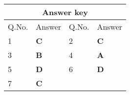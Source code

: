 \begin{table}[H]
	\centering
	\begin{tabular}{|p{1.5cm}|p{1.5cm}||p{1.5cm}|p{1.5cm}|}
		\hline
		\multicolumn{4}{|c|}{\textbf{Answer key}}\\\hline\hline
		\rowcolor{ocrel}Q.No.&Answer&Q.No.&Answer\\\hline
		1&\textbf{C} &2&\textbf{C}\\\hline 
		3&\textbf{B} &4&\textbf{A} \\\hline
		5&\textbf{D} &6 &\textbf{D} \\\hline
		7&\textbf{C} & & \\\hline
		
	\end{tabular}
\end{table}